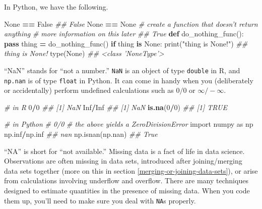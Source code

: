 \documentclass[12pt,krantz2]{krantz}
\makeatletter
\newenvironment{Shaded}{\begin{snugshade}}{\end{snugshade}}
\newcommand{\BuiltInTok}[1]{#1}
\newcommand{\CommentTok}[1]{\textcolor[rgb]{0.37,0.37,0.37}{\textit{#1}}}
\newcommand{\ControlFlowTok}[1]{\textcolor[rgb]{0.27,0.27,0.27}{\textbf{#1}}}
\newcommand{\DecValTok}[1]{\textcolor[rgb]{0.06,0.06,0.06}{#1}}
\newcommand{\ImportTok}[1]{#1}
\newcommand{\KeywordTok}[1]{\textcolor[rgb]{0.27,0.27,0.27}{\textbf{#1}}}
\newcommand{\NormalTok}[1]{#1}
\newcommand{\OperatorTok}[1]{\textcolor[rgb]{0.43,0.43,0.43}{\textbf{#1}}}
\newcommand{\OtherTok}[1]{\textcolor[rgb]{0.37,0.37,0.37}{#1}}
\newcommand{\StringTok}[1]{\textcolor[rgb]{0.5,0.5,0.5}{#1}}
\newcommand{\VariableTok}[1]{\textcolor[rgb]{0,0,0}{#1}}
\newenvironment{kframe}{%
\medskip{}
\setlength{\fboxsep}{.8em}
 \def\at@end@of@kframe{}%
 \ifinner\ifhmode%
  \def\at@end@of@kframe{\end{minipage}}%
  \begin{minipage}{\columnwidth}%
 \fi\fi%
 \def\FrameCommand##1{\hskip\@totalleftmargin \hskip-\fboxsep
 \colorbox{shadecolor}{##1}\hskip-\fboxsep
     \hskip-\linewidth \hskip-\@totalleftmargin \hskip\columnwidth}%
 \MakeFramed {\advance\hsize-\width
   \@totalleftmargin\z@ \linewidth\hsize
   \@setminipage}}%
 {\par\unskip\endMakeFramed%
 \at@end@of@kframe}
\renewenvironment{Shaded}{\begin{kframe}}{\end{kframe}}
\makeatother
\begin{document}
In Python, we have the following.

\begin{Shaded}
\begin{Highlighting}[]
\VariableTok{None} \OperatorTok{==} \VariableTok{False}
\CommentTok{## False}
\VariableTok{None} \OperatorTok{==} \VariableTok{None}
\CommentTok{# create a function that doesn't return anything}
\CommentTok{# more information on this later}
\CommentTok{## True}
\KeywordTok{def}\NormalTok{ do_nothing_func():}
    \ControlFlowTok{pass}
\NormalTok{thing }\OperatorTok{=}\NormalTok{ do_nothing_func()}
\ControlFlowTok{if}\NormalTok{ thing }\KeywordTok{is} \VariableTok{None}\NormalTok{:}
    \BuiltInTok{print}\NormalTok{(}\StringTok{"thing is None!"}\NormalTok{)}
\CommentTok{## thing is None!}
\BuiltInTok{type}\NormalTok{(}\VariableTok{None}\NormalTok{)}
\CommentTok{## <class 'NoneType'>}
\end{Highlighting}
\end{Shaded}

``NaN'' stands for ``not a number.'' \texttt{NaN} is an object of type \texttt{double} in R, and \texttt{np.nan} is of type \texttt{float} in Python. It can come in handy when you (deliberately or accidentally) perform undefined calculations such as \(0/0\) or \(\infty / -\infty\).

\begin{Shaded}
\begin{Highlighting}[]
\CommentTok{# in R}
\DecValTok{0}\OperatorTok{/}\DecValTok{0}
\CommentTok{## [1] NaN}
\OtherTok{Inf}\OperatorTok{/}\OtherTok{Inf}
\CommentTok{## [1] NaN}
\KeywordTok{is.na}\NormalTok{(}\DecValTok{0}\OperatorTok{/}\DecValTok{0}\NormalTok{)}
\CommentTok{## [1] TRUE}
\end{Highlighting}
\end{Shaded}

\begin{Shaded}
\begin{Highlighting}[]
\CommentTok{# in Python}
\CommentTok{# 0/0 }
\CommentTok{# the above yields a ZeroDivisionError}
\ImportTok{import}\NormalTok{ numpy }\ImportTok{as}\NormalTok{ np}
\NormalTok{np.inf}\OperatorTok{/}\NormalTok{np.inf}
\CommentTok{## nan}
\NormalTok{np.isnan(np.nan)}
\CommentTok{## True}
\end{Highlighting}
\end{Shaded}

``NA'' is short for ``not available.'' Missing data is a fact of life in data science. Observations are often missing in data sets, introduced after joining/merging data sets together (more on this in section \ref{merging-or-joining-data-sets}), or arise from calculations involving underflow and overflow. There are many techniques designed to estimate quantities in the presence of missing data. When you code them up, you'll need to make sure you deal with \texttt{NA}s properly.
\end{document}
